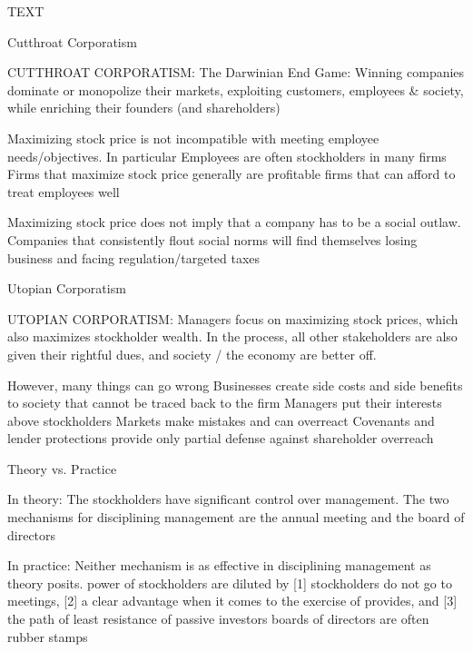 \documentclass[10pt]{article}
\begin{document}
    TEXT

    \begin{core}{Cutthroat Corporatism}

      CUTTHROAT CORPORATISM: The Darwinian End Game: Winning companies dominate or monopolize their markets, exploiting customers, employees & society, while enriching their founders (and shareholders)

      Maximizing stock price is not incompatible with meeting employee needs/objectives. In particular
      Employees are often stockholders in many firms
      Firms that maximize stock price generally are profitable firms that can afford to treat employees well

      Maximizing stock price does not imply that a company has to be a social outlaw. Companies that consistently flout social norms will find themselves losing business and facing regulation/targeted taxes

    \end{core}

    \begin{core}{Utopian Corporatism}

      UTOPIAN CORPORATISM: Managers focus on maximizing stock prices, which also maximizes stockholder wealth. In the process, all other stakeholders are also given their rightful dues, and society / the economy are better off.

      However, many things can go wrong
      Businesses create side costs and side benefits to society that cannot be traced back to the firm
      Managers put their interests above stockholders
      Markets make mistakes and can overreact
      Covenants and lender protections provide only partial defense against shareholder overreach

    \end{core}

    \begin{core}{Theory vs. Practice}

      In theory: The stockholders have significant control over management. The two mechanisms for disciplining management are the annual meeting and the board of directors

      In practice: Neither mechanism is as effective in disciplining management as theory posits.
      power of stockholders are diluted by [1] stockholders do not go to meetings, [2] a clear advantage when it comes to the exercise of provides, and [3] the path of least resistance of passive investors
      boards of directors are often rubber stamps

    \end{core}
\end{document}
